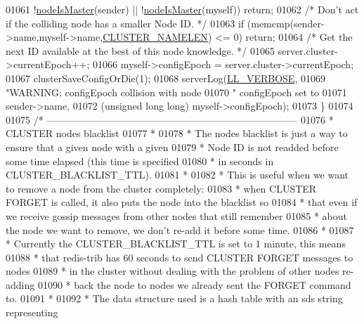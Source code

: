 \begin{DoxyCode}
{{{{{{{{{{{{{01061         !\hyperlink{cluster_8h_a2d8e84269474d8750565fb3fb67aa436}{nodeIsMaster}(sender) || !\hyperlink{cluster_8h_a2d8e84269474d8750565fb3fb67aa436}{nodeIsMaster}(myself)) \textcolor{keywordflow}{return};
01062     \textcolor{comment}{/* Don't act if the colliding node has a smaller Node ID. */}
01063     \textcolor{keywordflow}{if} (memcmp(sender->name,myself->name,\hyperlink{cluster_8h_ace7a882972eff7149675252938643b6e}{CLUSTER\_NAMELEN}) <= 0) \textcolor{keywordflow}{return};
01064     \textcolor{comment}{/* Get the next ID available at the best of this node knowledge. */}
01065     server.cluster->currentEpoch++;
01066     myself->configEpoch = server.cluster->currentEpoch;
01067     clusterSaveConfigOrDie(1);
01068     serverLog(\hyperlink{server_8h_a479b60032f8da6d8ad72e1a9d0809950}{LL\_VERBOSE},
01069         \textcolor{stringliteral}{"WARNING: configEpoch collision with node %
01070         \textcolor{stringliteral}{" configEpoch set to %
01071         sender->name,
01072         (\textcolor{keywordtype}{unsigned} \textcolor{keywordtype}{long} \textcolor{keywordtype}{long}) myself->configEpoch);
01073 \}
01074 
01075 \textcolor{comment}{/* -----------------------------------------------------------------------------}
01076 \textcolor{comment}{ * CLUSTER nodes blacklist}
01077 \textcolor{comment}{ *}
01078 \textcolor{comment}{ * The nodes blacklist is just a way to ensure that a given node with a given}
01079 \textcolor{comment}{ * Node ID is not readded before some time elapsed (this time is specified}
01080 \textcolor{comment}{ * in seconds in CLUSTER\_BLACKLIST\_TTL).}
01081 \textcolor{comment}{ *}
01082 \textcolor{comment}{ * This is useful when we want to remove a node from the cluster completely:}
01083 \textcolor{comment}{ * when CLUSTER FORGET is called, it also puts the node into the blacklist so}
01084 \textcolor{comment}{ * that even if we receive gossip messages from other nodes that still remember}
01085 \textcolor{comment}{ * about the node we want to remove, we don't re-add it before some time.}
01086 \textcolor{comment}{ *}
01087 \textcolor{comment}{ * Currently the CLUSTER\_BLACKLIST\_TTL is set to 1 minute, this means}
01088 \textcolor{comment}{ * that redis-trib has 60 seconds to send CLUSTER FORGET messages to nodes}
01089 \textcolor{comment}{ * in the cluster without dealing with the problem of other nodes re-adding}
01090 \textcolor{comment}{ * back the node to nodes we already sent the FORGET command to.}
01091 \textcolor{comment}{ *}
01092 \textcolor{comment}{ * The data structure used is a hash table with an sds string representing}
}}}}}}}}}}}}}}}
\end{DoxyCode}
